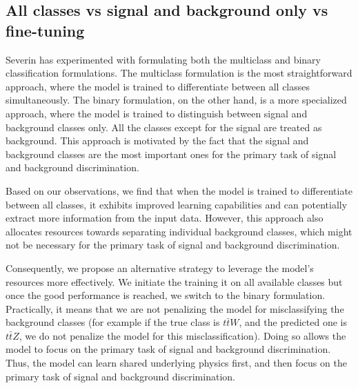 \subsection{All classes vs signal and background only vs fine-tuning}



Severin has experimented with formulating both the multiclass and binary classification formulations. The multiclass
formulation is the most straightforward approach, where the model is trained to differentiate between all classes
simultaneously. The binary formulation, on the other hand, is a more specialized approach, where the model is trained to
distinguish between signal and background classes only. All the classes except for the signal are treated as background.
This approach is motivated by the fact that the signal and background classes are the most important ones for the
primary task of signal and background discrimination.

Based on our observations, we find that when the model is trained to differentiate between all classes, it exhibits
improved learning capabilities and can potentially extract more information from the input data. However, this approach
also allocates resources towards separating individual background classes, which might not be necessary for the primary
task of signal and background discrimination.

Consequently, we propose an alternative strategy to leverage the model's resources more effectively. We initiate the
training it on all available classes but once the good performance is reached, we switch to the binary formulation.
Practically, it means that we are not penalizing the model for misclassifying the background classes (for example if the
true class is $t\bar{t}W$, and the predicted one is $t\bar{t}Z$, we do not penalize the model for this
misclassification). Doing so allows the model to focus on the primary task of signal and background discrimination.
Thus, the model can learn shared underlying physics first, and then focus on the primary task of signal and background
discrimination.


